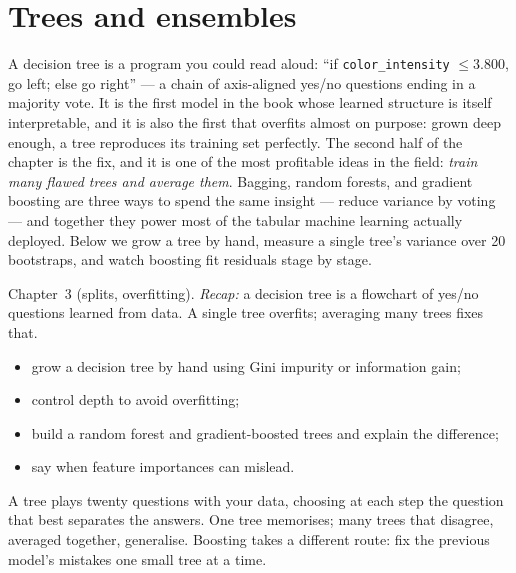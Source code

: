 \chapter{Trees and ensembles}\label{ch:trees}

A decision tree is a program you could read aloud:
``if \texttt{color\_intensity} $\le 3.800$, go left; else go right'' ---
a chain of axis-aligned yes/no questions ending in a majority vote. It is
the first model in the book whose learned structure is itself
interpretable, and it is also the first that overfits almost on purpose:
grown deep enough, a tree reproduces its training set perfectly. The
second half of the chapter is the fix, and it is one of the most
profitable ideas in the field: \emph{train many flawed trees and average
them}. Bagging, random forests, and gradient boosting are three ways to
spend the same insight --- reduce variance by voting --- and together they
power most of the tabular machine learning actually deployed. Below we
grow a tree by hand, measure a single tree's variance over 20 bootstraps,
and watch boosting fit residuals stage by stage.

\begin{rulebox}
Chapter~3 (splits, overfitting). \emph{Recap:} a decision tree is a flowchart of yes/no questions learned from data. A single tree overfits; averaging many trees fixes that.
\end{rulebox}
\begin{wins}
\begin{itemize}
\item grow a decision tree by hand using Gini impurity or information gain;
\item control depth to avoid overfitting;
\item build a random forest and gradient-boosted trees and explain the difference;
\item say when feature importances can mislead.
\end{itemize}
\end{wins}
\begin{principle}
A tree plays twenty questions with your data, choosing at each step the question that best separates the answers. One tree memorises; many trees that disagree, averaged together, generalise. Boosting takes a different route: fix the previous model's mistakes one small tree at a time.
\end{principle}

